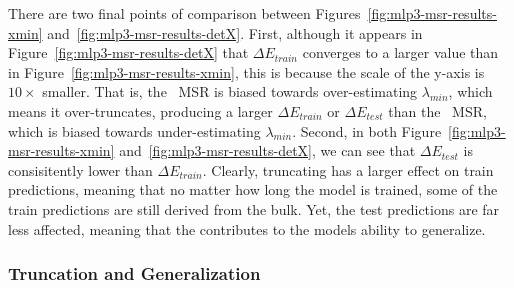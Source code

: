 There are two final points of comparison between Figures~\ref{fig:mlp3-msr-results-xmin} and~\ref{fig:mlp3-msr-results-detX}.
%
First, 
although it appears in Figure~\ref{fig:mlp3-msr-results-detX} that $\Delta E_{train}$ converges to a larger value than in Figure~\ref{fig:mlp3-msr-results-xmin}, this is because the scale of the y-axis is $10\times$ smaller. 
That is, the \POWERLAW~MSR is biased towards over-estimating $\lambda_{min}$, which means it over-truncates, producing a 
larger $\Delta E_{train}$ or $\Delta E_{test}$ 
than the \TRACELOG~MSR, which is biased towards under-estimating $\lambda_{min}$. 
%
Second,
in both Figure~\ref{fig:mlp3-msr-results-xmin} and~\ref{fig:mlp3-msr-results-detX}, we can see that $\Delta E_{test}$ is consisitently lower than $\Delta E_{train}$. 
Clearly, truncating has a larger effect on train predictions, meaning that no matter how long the model is trained, some 
of the train predictions are still derived from the bulk. 
Yet, the test predictions are far less affected, meaning that the \EffectiveCorrelationSpace contributes to the models ability to generalize.








\subsubsection{Truncation and Generalization}

